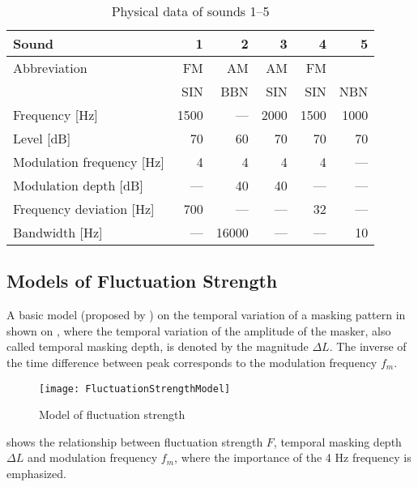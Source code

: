 \documentclass[../main.tex]{subfiles}
\begin{document}
\begin{theoreticalbackground}
\begin{table}
    \centering
    \begin{tabular}{ l r r r r r }
        \toprule
        Sound & 1 & 2 & 3 & 4 & 5 \\
        \midrule
        Abbreviation & FM & AM & AM & FM & \\
        & SIN & BBN & SIN & SIN & NBN \\
        Frequency [Hz] & 1500 & --- & 2000 & 1500 & 1000 \\
        Level [dB] & 70 & 60 & 70 & 70 & 70 \\
        Modulation frequency [Hz] & 4 & 4 & 4 & 4 & --- \\
        Modulation depth [dB] & --- & 40 & 40 & --- & --- \\
        Frequency deviation [Hz] & 700 & --- & --- & 32 & --- \\
        Bandwidth [Hz] & --- & 16000 & --- & --- & 10 \\
        \bottomrule
    \end{tabular}
    \caption{Physical data of sounds 1--5
        \cite[pp. 253]{Fastl2007Psychoacoustics}}
    \label{tab:flucstrensnds}
\end{table}

\subsection{Models of Fluctuation Strength}

A basic model (proposed by \citeauthor{Fastl2007Psychoacoustics}
\cite[pp.~254]{Fastl2007Psychoacoustics}) on the temporal variation of a masking
pattern in shown on , where the temporal variation of
the amplitude of the masker, also called temporal masking depth, is denoted by
the magnitude $\Delta L$. The inverse of the time difference between peak
corresponds to the modulation frequency $f_{m}$.

\begin{figure}
    \centering
    \texttt{[image: FluctuationStrengthModel]}
    \caption{Model of fluctuation strength
        \cite[pp. 254]{Fastl2007Psychoacoustics}}
    \label{fig:flucstrenmodel}
\end{figure}

 shows the relationship between fluctuation
strength $F$, temporal masking depth $\Delta L$ and modulation frequency
$f_{m}$, where the importance of the 4 Hz frequency is emphasized.


\end{theoreticalbackground}
\end{document}
